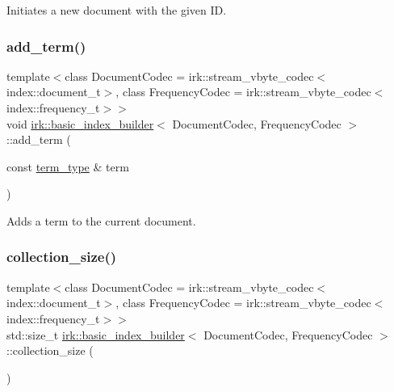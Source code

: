 Initiates a new document with the given ID. 

\mbox{\label{classirk_1_1basic__index__builder_a7eb14756ab6e8b0a45ff1e967997709b}} 
\subsubsection{\texorpdfstring{add\+\_\+term()}{add\_term()}}
{\footnotesize\ttfamily template$<$class Document\+Codec  = irk\+::stream\+\_\+vbyte\+\_\+codec$<$index\+::document\+\_\+t$>$, class Frequency\+Codec  = irk\+::stream\+\_\+vbyte\+\_\+codec$<$index\+::frequency\+\_\+t$>$$>$ \\
void \mbox{\hyperlink{classirk_1_1basic__index__builder}{irk\+::basic\+\_\+index\+\_\+builder}}$<$ Document\+Codec, Frequency\+Codec $>$\+::add\+\_\+term (\begin{DoxyParamCaption}\item[{const \mbox{\hyperlink{classirk_1_1basic__index__builder_a612e4d83700711a72d442056226a2908}{term\+\_\+type}} \&}]{term }\end{DoxyParamCaption})\hspace{0.3cm}{\ttfamily [inline]}}



Adds a term to the current document. 

\mbox{\label{classirk_1_1basic__index__builder_ac65b6c8e3ee962c25f5216203e1f250e}} 
\subsubsection{\texorpdfstring{collection\+\_\+size()}{collection\_size()}}
{\footnotesize\ttfamily template$<$class Document\+Codec  = irk\+::stream\+\_\+vbyte\+\_\+codec$<$index\+::document\+\_\+t$>$, class Frequency\+Codec  = irk\+::stream\+\_\+vbyte\+\_\+codec$<$index\+::frequency\+\_\+t$>$$>$ \\
std\+::size\+\_\+t \mbox{\hyperlink{classirk_1_1basic__index__builder}{irk\+::basic\+\_\+index\+\_\+builder}}$<$ Document\+Codec, Frequency\+Codec $>$\+::collection\+\_\+size (\begin{DoxyParamCaption}{ }\end{DoxyParamCaption})\hspace{0.3cm}{\ttfamily [inline]}}



